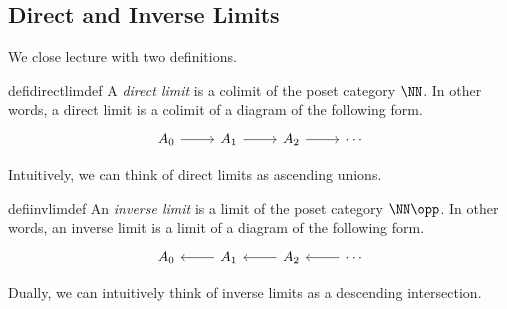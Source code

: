 \documentclass[../notes.tex]{subfiles}
\begin{document}
\subsection{Direct and Inverse Limits}
We close lecture with two definitions.
\begin{restatable}{defi}{directlimdef} %
	A \textit{direct limit} is a colimit of the poset category $\NN$. In other words, a direct limit is a colimit of a diagram of the following form.
	\[\begin{tikzcd}[ampersand replacement=\&]
		{A_0} \& {A_1} \& {A_2} \& \cdots
		\arrow[from=1-1, to=1-2]
		\arrow[from=1-2, to=1-3]
		\arrow[from=1-3, to=1-4]
	\end{tikzcd}\]
\end{restatable}
\noindent Intuitively, we can think of direct limits as ascending unions.
\begin{restatable}{defi}{invlimdef} %
	An \textit{inverse limit} is a limit of the poset category $\NN\opp$. In other words, an inverse limit is a limit of a diagram of the following form.
	\[\begin{tikzcd}[ampersand replacement=\&]
		{A_0} \& {A_1} \& {A_2} \& \cdots
		\arrow[from=1-2, to=1-1]
		\arrow[from=1-3, to=1-2]
		\arrow[from=1-4, to=1-3]
	\end{tikzcd}\]
\end{restatable}
\noindent Dually, we can intuitively think of inverse limits as a descending intersection.
\end{document}
